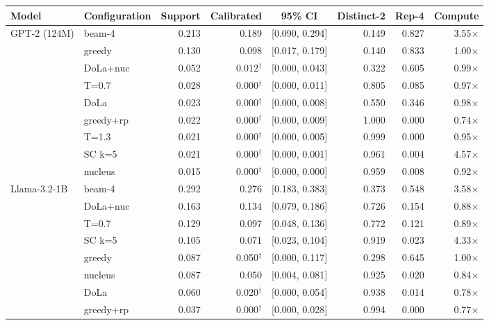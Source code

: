 \begin{table}[t]
  \centering
  \small
  \begin{tabular}{ll rrc rr r}
    \toprule
    \textbf{Model} & \textbf{Configuration} & \textbf{Support} & \textbf{Calibrated} & \textbf{95\% CI} & \textbf{Distinct-2} & \textbf{Rep-4} & \textbf{Compute} \\
    \midrule
    GPT-2 (124M) & beam-4 & 0.213 & 0.189 & [0.090, 0.294] & 0.149 & 0.827 & 3.55$\times$ \\
     & greedy & 0.130 & 0.098 & [0.017, 0.179] & 0.140 & 0.833 & 1.00$\times$ \\
     & DoLa+nuc & 0.052 & 0.012$^{\dagger}$ & [0.000, 0.043] & 0.322 & 0.605 & 0.99$\times$ \\
     & T=0.7 & 0.028 & 0.000$^{\dagger}$ & [0.000, 0.011] & 0.805 & 0.085 & 0.97$\times$ \\
     & DoLa & 0.023 & 0.000$^{\dagger}$ & [0.000, 0.008] & 0.550 & 0.346 & 0.98$\times$ \\
     & greedy+rp & 0.022 & 0.000$^{\dagger}$ & [0.000, 0.009] & 1.000 & 0.000 & 0.74$\times$ \\
     & T=1.3 & 0.021 & 0.000$^{\dagger}$ & [0.000, 0.005] & 0.999 & 0.000 & 0.95$\times$ \\
     & SC k=5 & 0.021 & 0.000$^{\dagger}$ & [0.000, 0.001] & 0.961 & 0.004 & 4.57$\times$ \\
     & nucleus & 0.015 & 0.000$^{\dagger}$ & [0.000, 0.000] & 0.959 & 0.008 & 0.92$\times$ \\
    \midrule
    Llama-3.2-1B & beam-4 & 0.292 & 0.276 & [0.183, 0.383] & 0.373 & 0.548 & 3.58$\times$ \\
     & DoLa+nuc & 0.163 & 0.134 & [0.079, 0.186] & 0.726 & 0.154 & 0.88$\times$ \\
     & T=0.7 & 0.129 & 0.097 & [0.048, 0.136] & 0.772 & 0.121 & 0.89$\times$ \\
     & SC k=5 & 0.105 & 0.071 & [0.023, 0.104] & 0.919 & 0.023 & 4.33$\times$ \\
     & greedy & 0.087 & 0.050$^{\dagger}$ & [0.000, 0.117] & 0.298 & 0.645 & 1.00$\times$ \\
     & nucleus & 0.087 & 0.050 & [0.004, 0.081] & 0.925 & 0.020 & 0.84$\times$ \\
     & DoLa & 0.060 & 0.020$^{\dagger}$ & [0.000, 0.054] & 0.938 & 0.014 & 0.78$\times$ \\
     & greedy+rp & 0.037 & 0.000$^{\dagger}$ & [0.000, 0.028] & 0.994 & 0.000 & 0.77$\times$ \\

\end{tabular}
\end{table}
